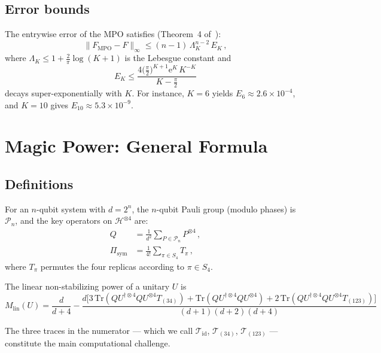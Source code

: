 \documentclass[11pt,a4paper]{article}
\theoremstyle{definition}
\theoremstyle{remark}
\newcommand{\HH}{\mathcal{H}}
\newcommand{\PP}{\mathcal{P}}
\newcommand{\Mlin}{M_{\mathrm{lin}}}
\newcommand{\MPO}{\mathrm{MPO}}
\renewcommand{\Tr}{\mathrm{Tr}}
\newcommand{\ee}{\mathrm{e}}
\begin{document}
\subsection{Error bounds}

The entrywise error of the MPO satisfies (Theorem~4 of~\cite{ChenLindsey2026}):
\begin{equation}\label{eq:error_bound}
  \|F_{\MPO} - F\|_\infty \le (n-1)\,\Lambda_K^{n-2}\, E_K\,,
\end{equation}
where $\Lambda_K \le 1+\frac{2}{\pi}\log(K+1)$ is the Lebesgue constant and
\begin{equation}
  E_K \le \frac{4\bigl(\frac{\pi}{2}\bigr)^{K+1}\ee^K\, K^{-K}}{K-\frac{\pi}{2}}
\end{equation}
decays super-exponentially with $K$.  For instance, $K=6$ yields $E_6 \approx 2.6\times 10^{-4}$, and $K=10$ gives $E_{10}\approx 5.3\times10^{-9}$.

\section{Magic Power: General Formula}
\label{sec:magic_review}

\subsection{Definitions}

For an $n$-qubit system with $d=2^n$, the $n$-qubit Pauli group (modulo phases) is $\PP_n$, and the key operators on $\HH^{\otimes 4}$ are:
\begin{align}
  Q &= \frac{1}{d^2}\sum_{P\in\PP_n} P^{\otimes 4}\,,\label{eq:Q}\\
  \Pi_{\mathrm{sym}} &= \frac{1}{4!}\sum_{\pi\in S_4} T_\pi\,,\label{eq:Pisym}
\end{align}
where $T_\pi$ permutes the four replicas according to $\pi\in S_4$.

The linear non-stabilizing power of a unitary $U$ is
\begin{equation}\label{eq:Mlin_general}
  \boxed{
  \Mlin(U) = \frac{d}{d+4} -
  \frac{d\bigl[3\,\Tr(QU^{\dagger\otimes 4}QU^{\otimes 4}T_{(34)})
    + \Tr(QU^{\dagger\otimes 4}QU^{\otimes 4})
    + 2\,\Tr(QU^{\dagger\otimes 4}QU^{\otimes 4}T_{(123)})\bigr]}
       {(d+1)(d+2)(d+4)}
  }
\end{equation}

The three traces in the numerator --- which we call $\mathcal{T}_{\mathrm{id}}$, $\mathcal{T}_{(34)}$, $\mathcal{T}_{(123)}$ --- constitute the main computational challenge.
\end{document}
